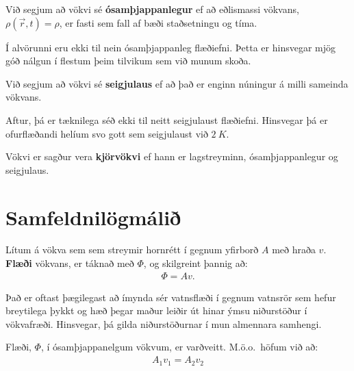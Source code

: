 \ifdefined \wholebook \else\documentclass[oneside]{book}\usepackage{EdlBook}\graphicspath{{figures/}}
\begin{document}
\begin{tcolorbox}
\begin{definition}
Við segjum að vökvi sé \textbf{ósamþjappanlegur} ef að eðlismassi vökvans, $\rho(\Vec{r},t) = \rho$, er fasti sem fall af bæði staðsetningu og tíma.
\end{definition}
\end{tcolorbox}

Í alvörunni eru ekki til nein ósamþjappanleg flæðiefni. Þetta er hinsvegar mjög góð nálgun í flestum þeim tilvikum sem við munum skoða.

\begin{tcolorbox}
\begin{definition}
Við segjum að vökvi sé \textbf{seigjulaus} ef að það er enginn núningur á milli sameinda vökvans. 
\end{definition}
\end{tcolorbox}

Aftur, þá er tæknilega séð ekki til neitt seigjulaust flæðiefni. Hinsvegar þá er ofurflæðandi helíum svo gott sem seigjulaust við $\SI{2}{K}$.

\begin{tcolorbox}
\begin{definition}
Vökvi er sagður vera \textbf{kjörvökvi} ef hann er lagstreyminn, ósamþjappanlegur og seigjulaus.
\end{definition}
\end{tcolorbox}



\section{Samfeldnilögmálið}

\begin{tcolorbox}
\begin{definition}
Lítum á vökva sem sem streymir hornrétt í gegnum yfirborð $A$ með hraða $v$. \textbf{Flæði} vökvans, er táknað með $\Phi$, og skilgreint þannig að:
 \begin{align*}
     \Phi = Av.
 \end{align*}
\end{definition}
\end{tcolorbox}

Það er oftast þægilegast að ímynda sér vatnsflæði í gegnum vatnsrör sem hefur breytilega þykkt og hæð þegar maður leiðir út hinar ýmsu niðurstöður í vökvafræði. Hinsvegar, þá gilda niðurstöðurnar í mun almennara samhengi.

\begin{tcolorbox}
\begin{theorem}
Flæði, $\Phi$, í ósamþjappanelgum vökvum, er varðveitt. M.ö.o.~höfum við að:
\begin{align*}
    A_1 v_1 = A_2 v_2
\end{align*}
\end{theorem}
\end{tcolorbox}
\end{document}
